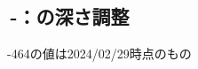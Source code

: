 \clearpage
\subsection{\,-：\dimple の深さ調整}
\begin{marker}
-\ttNum464の値は2024/02/29時点のもの
\end{marker}

